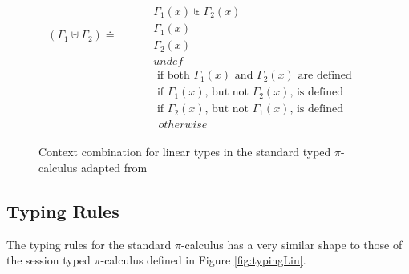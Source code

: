 \begin{figure}[h]
    \centering
    \begin{align*}
        \begin{split}
            (\Gamma_1 \uplus \Gamma_2) \doteq & 
        \end{split}
        &
        \begin{split}
            & \Gamma_1 (x) \uplus \Gamma_2 (x) \\
            & \Gamma_1(x) \\
            & \Gamma_2(x) \\
            & undef 
        \end{split}
        \begin{split}
            & \text{ if both } \Gamma_1 (x) \text{ and } \Gamma_2 (x) \text{ are defined} \\
            & \text{ if } \Gamma_1 (x) \text{, but not } \Gamma_2 (x) \text{, is defined} \\
            & \text{ if } \Gamma_2 (x) \text{, but not } \Gamma_1 (x) \text{, is defined} \\
            &\:\: otherwise
        \end{split}
    \end{align*}
    \caption{Context combination for linear types in the standard typed $\pi$-calculus adapted from \citep{dardha2017session}}
    \label{fig:contextComb}
\end{figure}


\subsection{Typing Rules}
The typing rules for the standard $\pi$-calculus has a very similar shape to those of the session typed $\pi$-calculus defined in Figure \ref{fig:typingLin}. 

